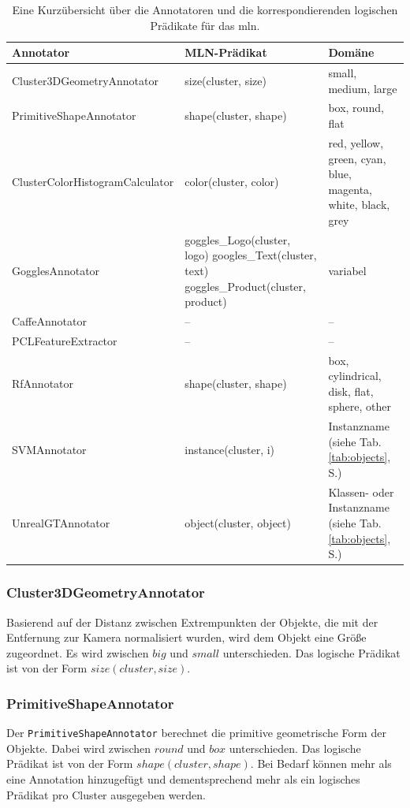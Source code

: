 \begin{table}
\begin{tabularx}{\textwidth}{lXX}
\textbf{Annotator}				& \textbf{MLN-Prädikat}	& \textbf{Domäne}	\\ \hline 
Cluster3DGeometryAnnotator		& size(cluster, size)	& small, medium, large	\\ 
PrimitiveShapeAnnotator			& shape(cluster, shape)	& box, round, flat 	\\ 
ClusterColorHistogramCalculator  & color(cluster, color)	& red, yellow, green, cyan, blue, magenta, white, black, grey \\ 
GogglesAnnotator				& goggles\_Logo(cluster, logo) \newline googles\_Text(cluster, text)  \newline goggles\_Product(cluster, product)	& 	variabel	\\ 
CaffeAnnotator					& --					& --	\\
PCLFeatureExtractor				& --					& --	\\ 
RfAnnotator						& shape(cluster, shape)	&	box, cylindrical, disk, flat, sphere, other	\\
SVMAnnotator					& instance(cluster, i)	& Instanzname (siehe Tab.\ref{tab:objects}, S.\pageref{tab:objects}) \\
UnrealGTAnnotator				& object(cluster, object)	& Klassen- oder Instanzname (siehe Tab.\ref{tab:objects}, S.\pageref{tab:objects})	\\ \hline 
\end{tabularx}
\caption[Kurzübersicht der Annotatoren]{Eine Kurzübersicht über die Annotatoren und die korrespondierenden logischen Prädikate für das \gls{mln}.}
\label{tab:annotators}
\end{table}

\subsubsection{Cluster3DGeometryAnnotator}
Basierend auf der Distanz zwischen Extrempunkten der Objekte, die mit der Entfernung zur Kamera normalisiert wurden, wird dem Objekt eine Größe zugeordnet. Es wird zwischen $big$ und $small$ unterschieden. Das logische Prädikat ist von der Form $size(cluster,  size)$. 

\subsubsection{PrimitiveShapeAnnotator} 
Der \texttt{PrimitiveShapeAnnotator} berechnet die primitive geometrische Form der Objekte.  Dabei wird zwischen $round$ und $box$ unterschieden. Das logische Prädikat ist von der Form $shape(cluster,  shape)$. Bei Bedarf können mehr als eine Annotation hinzugefügt und dementsprechend mehr als ein logisches Prädikat pro Cluster ausgegeben werden.
   
